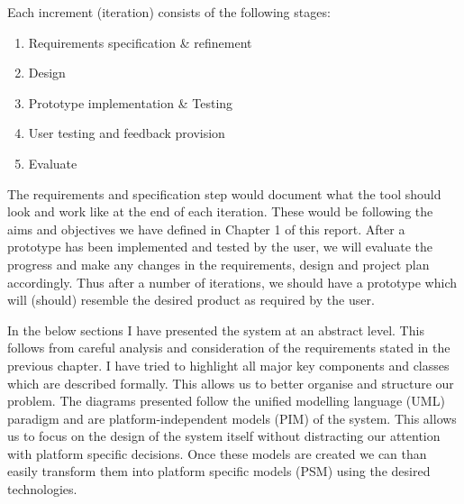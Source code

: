 Each increment (iteration) consists of the following stages:
\begin{enumerate}
	\item Requirements specification \& refinement
	\item Design
	\item Prototype implementation \& Testing
	\item User testing and feedback provision
	\item Evaluate
\end{enumerate}
The requirements and specification step would document what the tool should look and work like at the end of each iteration. These would be following the aims and objectives we have defined in Chapter 1 of this report. After a prototype has been implemented and tested by the user, we will evaluate the progress and make any changes in the requirements, design and project plan accordingly. Thus after a number of iterations, we should have a prototype which will (should) resemble the desired product as required by the user.

In the below sections I have presented the system at an abstract level. This follows from careful analysis and consideration of the requirements stated in the previous chapter. I have tried to highlight all major key components and classes which are described formally. This allows us to better organise and structure our problem. The diagrams presented follow the unified modelling language (UML) paradigm \cite{uml} and are platform-independent models (PIM) of the system. This allows us to focus on the design of the system itself without distracting our attention with platform specific decisions. Once these models are created we can than easily transform them into platform specific models (PSM) using the desired technologies.

